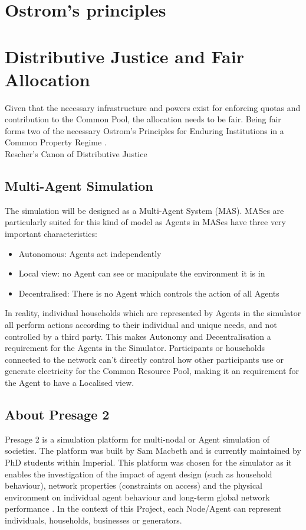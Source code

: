 \section*{Ostrom's principles}

\section*{Distributive Justice and Fair Allocation}
Given that the necessary infrastructure and powers exist for enforcing quotas and contribution to the Common Pool, the allocation needs to be fair. Being fair forms two of the necessary Ostrom's Principles for Enduring Institutions in a Common Property Regime \cite{Ostrom:90}. \\

Rescher's Canon of Distributive Justice

\subsection*{Multi-Agent Simulation}
The simulation will be designed as a Multi-Agent System (MAS). MASes are particularly suited for this kind of model as Agents in MASes have three very important characteristics:
\begin{itemize}
	\item Autonomous: Agents act independently
	\item Local view: no Agent can see or manipulate the environment it is in
	\item Decentralised: There is no Agent which controls the action of all Agents
\end{itemize}
In reality, individual households which are represented by Agents in the simulator all perform actions according to their individual and unique needs, and not controlled by a third party. This makes Autonomy and Decentralisation a requirement for the Agents in the Simulator. Participants or households connected to the network can't directly control how other participants use or generate electricity for the Common Resource Pool, making it an requirement for the Agent to have a Localised view. 

\subsection*{About Presage 2}
Presage 2 is a simulation platform for multi-nodal or Agent simulation of societies. The platform was built by Sam Macbeth and is currently maintained by PhD students within Imperial. This platform was chosen for the simulator as it enables the investigation of the impact of agent design (such as household behaviour), network properties (constraints on access) and the physical environment on individual agent behaviour and long-term global network performance \cite{Presage2-Desc:2015}. In the context of this Project, each Node/Agent can represent individuals, households, businesses or generators. 

